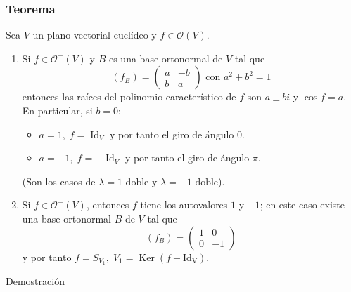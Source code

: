 \documentclass[12pt, a4paper, ones, notitlepage, openany,titlepage]{article}
\newcommand{\demostracion}{\noindent\underline{Demostración}}
\begin{document}
\subsubsection{Teorema}
Sea $V$ un plano vectorial euclídeo y $f \in \mathcal{O}(V)$. 
\begin{enumerate}[label=(\arabic*)]
	\item Si $f \in \mathcal{O}^+(V)$ y $B$ es una base ortonormal de $V$ tal que
	$$
	(f_B) =
	\begin{pmatrix}
		a & -b \\
		b & a
	\end{pmatrix}
	\text{ con } a^2 + b^2 = 1
	$$
	entonces las raíces del polinomio característico de $f$ son $a \pm bi$ y $\operatorname{cos}f = a$. En particular, si $b = 0$:
	\begin{itemize}
		\item $a = 1, \; f = \operatorname{Id}_V$ y por tanto el giro de ángulo $0$.
		\item $a = -1, \; f = -\operatorname{Id}_V$ y por tanto el giro de ángulo $\pi$.
	\end{itemize}
	(Son los casos de $\lambda = 1$ doble y $\lambda = -1$ doble).
	
	\item Si $f \in \mathcal{O}^-(V)$, entonces $f$ tiene los autovalores $1$ y $-1$; en este caso existe una base ortonormal $B$ de $V$ tal que
	$$
	(f_B) = \begin{pmatrix}
		1 & 0 \\
		0 & -1
	\end{pmatrix}
	$$
	y por tanto $f = S_{V_1}, \; V_1 = \operatorname{Ker}(f - \operatorname{Id_V})$.
\end{enumerate}
\demostracion
\end{document}
